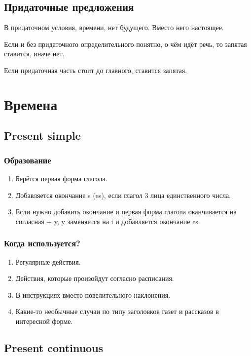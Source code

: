 \documentclass[oneside]{book}
\begin{document}
\section{Придаточные предложения}
В придаточном условия, времени, нет будущего. Вместо него настоящее.

Если и без придаточного определительного понятно, о чём идёт речь,
то запятая ставится, иначе нет.

Если придаточная часть стоит до главного, ставится запятая.

\chapter{Времена}
\section{Present simple}
\subsection{Образование}
\begin{enumerate}
    \item Берётся первая форма глагола.

    \item Добавляется окончание s (es), если глагол 3 лица единственного числа.

    \item Если нужно добавить окончание и первая форма глагола
    оканчивается на согласная + y, y заменяется на i и
    добавляется окончание es.
\end{enumerate}

\subsection{Когда используется?}
\begin{enumerate}
    \item Регулярные действия.
    \item Действия, которые произойдут согласно расписания.
    \item В инструкциях вместо повелительного наклонения.
    \item Какие-то необычные случаи по типу заголовков газет и
    рассказов в интересной форме.
\end{enumerate}

\section{Present continuous}
\end{document}
